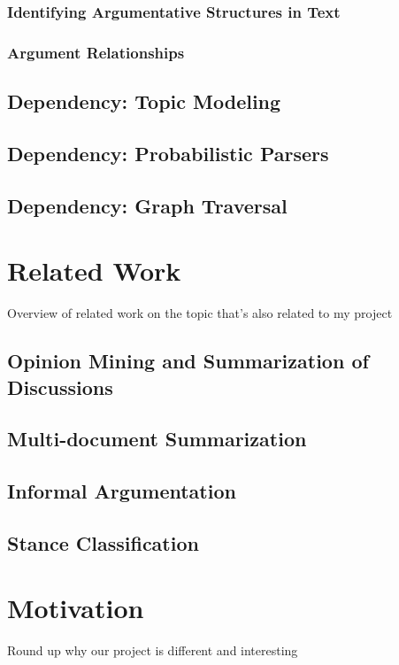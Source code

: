       \subsubsection{Identifying Argumentative Structures in Text}
      \subsubsection{Argument Relationships}
    \subsection{Dependency: Topic Modeling}
    \subsection{Dependency: Probabilistic Parsers}
    \subsection{Dependency: Graph Traversal}


  \section{Related Work}
    Overview of related work on the topic that's also related to my project
    \subsection{Opinion Mining and Summarization of Discussions}
    \subsection{Multi-document Summarization}
    \subsection{Informal Argumentation}
    \subsection{Stance Classification}
  \section{Motivation}
    Round up why our project is different and interesting
